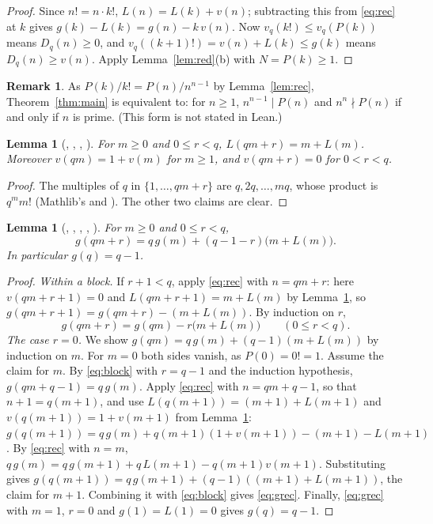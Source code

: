 \documentclass[11pt]{amsart}
\theoremstyle{plain}
\newtheorem{lemma}[theorem]{Lemma}
\theoremstyle{definition}
\newtheorem{remark}[theorem]{Remark}
\begin{document}
\begin{proof}
Since $n!=n\cdot k!$, $L(n)=L(k)+v(n)$; subtracting this from \eqref{eq:rec} at $k$ gives $g(k)-L(k)=g(n)-k\,v(n)$. Now $v_q(k!)\le v_q(P(k))$ means $D_q(n)\ge0$, and $v_q((k+1)!)=v(n)+L(k)\le g(k)$ means $D_q(n)\ge v(n)$. Apply Lemma~\ref{lem:red}(b) with $N=P(k)\ge1$.
\end{proof}

\begin{remark}\label{rem:pow}
As $P(k)/k!=P(n)/n^{n-1}$ by Lemma~\ref{lem:rec}, Theorem~\ref{thm:main} is equivalent to: for $n\ge1$, $n^{n-1}\mid P(n)$ and $n^n\nmid P(n)$ if and only if $n$ is prime. (This form is not stated in Lean.)
\end{remark}

\begin{lemma}[, , , ]\label{lem:L}
For $m\ge0$ and $0\le r<q$, $L(qm+r)=m+L(m)$. Moreover $v(qm)=1+v(m)$ for $m\ge1$, and $v(qm+r)=0$ for $0<r<q$.
\end{lemma}

\begin{proof}
The multiples of $q$ in $\{1,\dots,qm+r\}$ are $q,2q,\dots,mq$, whose product is $q^m m!$ (Mathlib's  and ). The other two claims are clear.
\end{proof}

\begin{lemma}[, , , , ]\label{lem:grec}
For $m\ge0$ and $0\le r<q$,
\begin{equation}\label{eq:grec}
  g(qm+r)=q\,g(m)+(q-1-r)\bigl(m+L(m)\bigr).
\end{equation}
In particular $g(q)=q-1$.
\end{lemma}

\begin{proof}
\emph{Within a block.} If $r+1<q$, apply \eqref{eq:rec} with $n=qm+r$: here $v(qm+r+1)=0$ and $L(qm+r+1)=m+L(m)$ by Lemma~\ref{lem:L}, so $g(qm+r+1)=g(qm+r)-(m+L(m))$. By induction on $r$,
\begin{equation}\label{eq:block}
  g(qm+r)=g(qm)-r\bigl(m+L(m)\bigr)\qquad(0\le r<q).
\end{equation}
\emph{The case $r=0$.} We show $g(qm)=q\,g(m)+(q-1)(m+L(m))$ by induction on $m$. For $m=0$ both sides vanish, as $P(0)=0!=1$. Assume the claim for $m$. By \eqref{eq:block} with $r=q-1$ and the induction hypothesis, $g(qm+q-1)=q\,g(m)$. Apply \eqref{eq:rec} with $n=qm+q-1$, so that $n+1=q(m+1)$, and use $L(q(m+1))=(m+1)+L(m+1)$ and $v(q(m+1))=1+v(m+1)$ from Lemma~\ref{lem:L}: $g(q(m+1))=q\,g(m)+q(m+1)(1+v(m+1))-(m+1)-L(m+1)$. By \eqref{eq:rec} with $n=m$, $q\,g(m)=q\,g(m+1)+q\,L(m+1)-q(m+1)v(m+1)$. Substituting gives $g(q(m+1))=q\,g(m+1)+(q-1)((m+1)+L(m+1))$, the claim for $m+1$. Combining it with \eqref{eq:block} gives \eqref{eq:grec}. Finally, \eqref{eq:grec} with $m=1$, $r=0$ and $g(1)=L(1)=0$ gives $g(q)=q-1$.
\end{proof}
\end{document}
